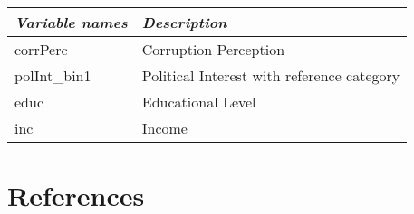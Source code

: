 \documentclass[
  12pt,
  english,
]{article}
\begin{document}
\begin{longtable}[]{@{}ll@{}}
\toprule
\emph{Variable names} & \emph{Description} \\
\midrule
\endhead
corrPerc & Corruption Perception \\
polInt\_bin1 & Political Interest with reference category \\
educ & Educational Level \\
inc & Income \\
\bottomrule
\end{longtable}

\clearpage

\hypertarget{references}{%
\section*{References}\label{references}}
\end{document}
